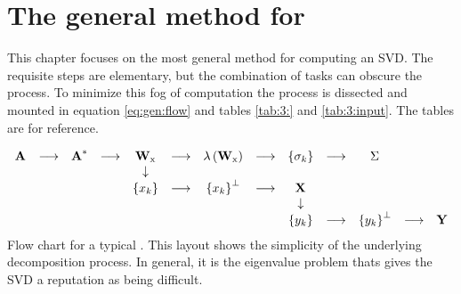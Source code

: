 \section[The general method for SVD]{The general method for \svdl}

This chapter focuses on the most general method for computing an SVD. The requisite steps are elementary, but the combination of tasks can obscure the process. To minimize this fog of computation the process is dissected and mounted in equation \eqref{eq:gen:flow} and tables \eqref{tab:3:} and \eqref{tab:3:input}. The tables are for reference.

\begin{landscape}
\thispagestyle{empty}

\begin{equation}
  \begin{array}{ccccccccccccc}
  \textbf{A}^{\mathrm{}}&\longrightarrow&\textbf{A}^{\mathrm{*}}&\longrightarrow&\textbf{W}_{\mathrm{x}}&\longrightarrow&\lambda\left( \textbf{W}_{\mathrm{x}} \right)&\longrightarrow&\left\{ \sigma_{k} \right\}&\longrightarrow&\Sigma^{\mathrm{}}\\
  &&&&\downarrow\\
  &&&&\left\{ x_{k} \right\}&\longrightarrow&\left\{ x_{k} \right\}^{\perp}&\longrightarrow&\textbf{X}^{\mathrm{}}\\
  &&&&&&&&\downarrow\\
  &&&&&&&&\left\{ y_{k} \right\}&\longrightarrow&\left\{ y_{k} \right\}^{\perp}&\longrightarrow&\textbf{Y}^{\mathrm{}}\\
  \end{array}
  \label{eq:gen:flow}
\end{equation}
Flow chart for a typical \svdl. This layout shows the simplicity of the underlying decomposition process. In general, it is the eigenvalue problem thats gives the SVD a reputation as being difficult.


\end{landscape}
